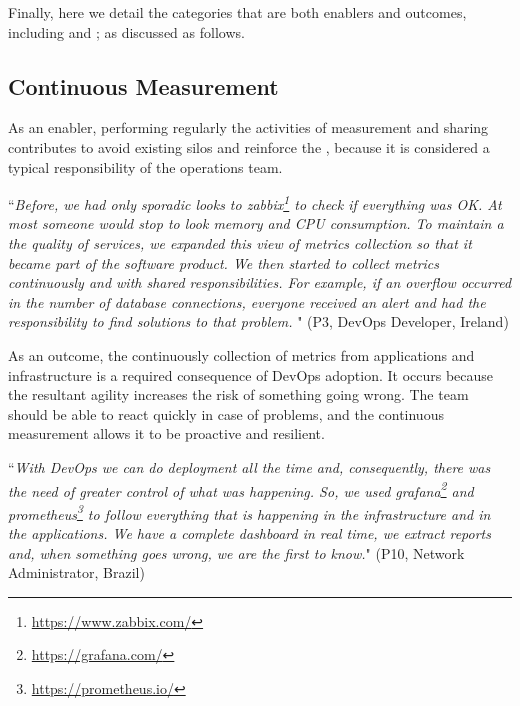Finally, here we detail the categories that are both enablers
and outcomes, including 
and ; as discussed as follows.

\subsection{Continuous Measurement}

As an enabler, performing regularly the
activities of measurement and sharing
contributes to avoid existing silos and reinforce the \cc, because it is
considered a typical responsibility of the operations team.

\begin{mq}
``\emph{Before, we had only sporadic looks to
zabbix\footnote{\url{https://www.zabbix.com/}} to check if everything was OK.
At most someone would stop to look memory and CPU consumption. To maintain a
the quality of services, we expanded this view of metrics collection so that it
became part of the software product. We then started to collect metrics continuously
and with shared responsibilities. For example, if an overflow occurred in the
number of database connections, everyone received an alert and had
the responsibility to find solutions to that problem. %
}" (P3, DevOps Developer, Ireland)
\end{mq}

As an outcome, the continuously collection of metrics from applications and
infrastructure is a required consequence of DevOps adoption. It occurs because
the resultant agility increases the risk of something going wrong. The team
should be able to react quickly in case of problems, and the continuous
measurement allows it to be proactive and resilient.

\begin{mq}
``\emph{With DevOps we can do deployment all the time and, consequently, there was
the need of greater control of what was happening. So, we used
grafana\footnote{\url{https://grafana.com/}} and
prometheus\footnote{\url{https://prometheus.io/}} to follow everything that is
happening in the infrastructure and in the applications. We have a complete
dashboard in real time, we extract reports and, when something goes wrong, we
are the first to know.}" (P10, Network Administrator, Brazil)
\end{mq}


